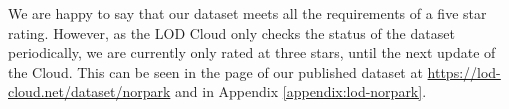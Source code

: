 \vspace{5mm}

We are happy to say that our dataset meets all the requirements of a five star rating. 
However, as the LOD Cloud only checks the status of the dataset periodically, we are currently only rated at three stars, until the next update of the Cloud. This can be seen in the page of our published dataset at \url{https://lod-cloud.net/dataset/norpark} and in Appendix \ref{appendix:lod-norpark}.


